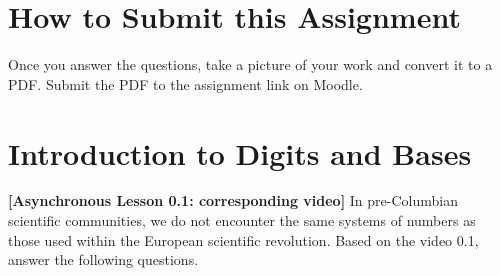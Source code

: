 \documentclass[10pt]{article}
\begin{document}
\maketitle

\section{How to Submit this Assignment}

Once you answer the questions, take a picture of your work and convert it to a PDF.  Submit the PDF to the assignment link on Moodle.

\section{Introduction to Digits and Bases}

\textbf{[Asynchronous Lesson 0.1: corresponding video]} In pre-Columbian scientific communities, we do not encounter the same systems of numbers as those used within the European scientific revolution.  Based on the video 0.1, answer the following questions.
\end{document}
